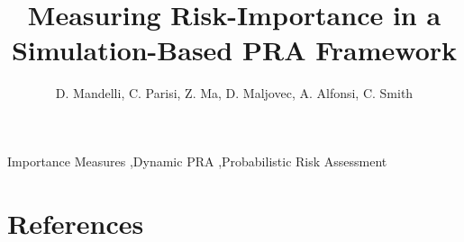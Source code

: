 \documentclass{elsarticle}
\begin{document}
\begin{frontmatter}

\title{Measuring Risk-Importance in a Simulation-Based PRA Framework}

\author{D. Mandelli, C. Parisi, Z. Ma, D. Maljovec, A. Alfonsi, C. Smith}
\address{Idaho National Laboratory (INL), 2525 Fremont Ave, 83402 Idaho Falls (ID), USA}

\begin{abstract}
  
\end{abstract}

\begin{keyword}
Importance Measures \sep Dynamic PRA \sep Probabilistic Risk Assessment 
\end{keyword}

\end{frontmatter}

\linenumbers

\printnomenclature[1in]













\section*{References}


\end{document}
